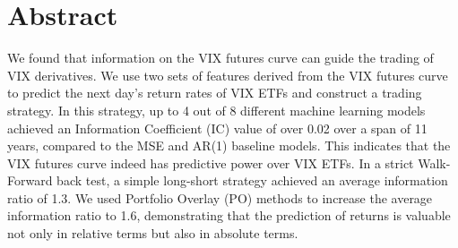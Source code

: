 \documentclass[10pt,letterpaper]{article}
\begin{document}
\section*{Abstract}
We found that information on the VIX futures curve can guide the trading of VIX derivatives. We use two sets of features derived from the VIX futures curve to predict the next day's return rates of VIX ETFs and construct a trading strategy. In this strategy, up to 4 out of 8 different machine learning models achieved an Information Coefficient (IC) value of over 0.02 over a span of 11 years, compared to the MSE and AR(1) baseline models. This indicates that the VIX futures curve indeed has predictive power over VIX ETFs. In a strict Walk-Forward back test, a simple long-short strategy achieved an average information ratio of 1.3. We used Portfolio Overlay (PO) methods to increase the average information ratio to 1.6, demonstrating that the prediction of returns is valuable not only in relative terms but also in absolute terms.




\end{document}
